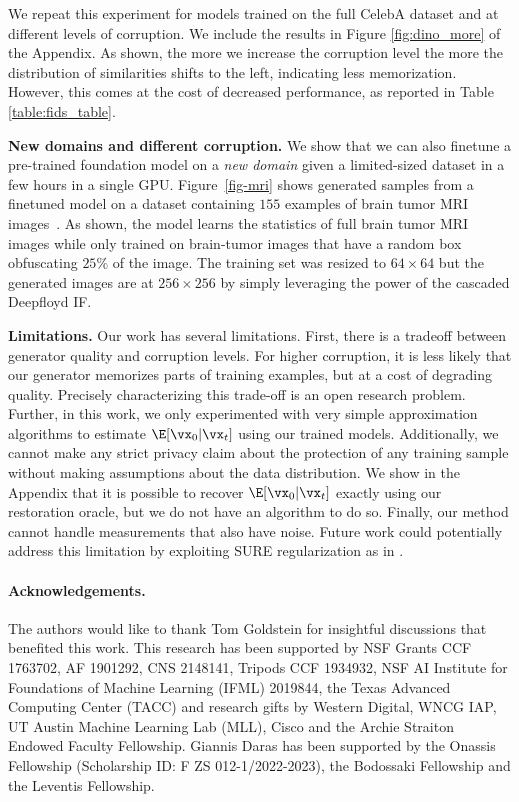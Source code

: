 \documentclass{article}
\begin{document}
We repeat this experiment for models trained on the full CelebA dataset and at different levels of corruption. We include the results in Figure \ref{fig:dino_more} of the Appendix. As shown, the more we increase the corruption level the more the distribution of similarities shifts to the left, indicating less memorization. However, this comes at the cost of decreased performance, as reported in Table \ref{table:fids_table}.


\textbf{New domains and different corruption.}
We show that we can also finetune a pre-trained foundation model on a \textit{new domain} given a limited-sized dataset in a few hours in a single GPU. Figure~\ref{fig-mri} shows generated samples from a finetuned model on a dataset containing $155$ examples of brain tumor MRI images~\citep{brain-tumor-dataset}.
As shown, the model learns the statistics of full brain tumor MRI images while only trained on brain-tumor images that have a random box obfuscating $25\%$ of the image. 
The training set was resized to $64\times 64$ but the generated images are at $256 \times 256$ by simply leveraging the power of the cascaded Deepfloyd IF.



\textbf{Limitations.}
Our work has several limitations. First, there is a tradeoff between generator quality and corruption levels. For higher corruption, it is less likely that our generator memorizes parts of training examples, but at a cost of degrading quality. Precisely characterizing this trade-off is an open research problem. Further, in this work, we only experimented with very simple approximation algorithms to estimate $\E[\vx_0|\vx_t]$ using our trained models. Additionally, we cannot make any strict privacy claim about the protection of any training sample without making assumptions about the data distribution.
We show in the Appendix that it is possible to recover $\E[\vx_0|\vx_t]$ exactly using our restoration oracle, but we do not have an algorithm to do so. Finally, our method cannot handle measurements that also have noise. Future work could potentially address this limitation by exploiting SURE regularization as in \citep{aali2023solving}.

\paragraph{Acknowledgements.}
The authors would like to thank Tom Goldstein for insightful discussions that benefited this work.
This research has been supported by NSF Grants CCF 1763702,
AF 1901292, CNS 2148141, Tripods CCF 1934932, NSF AI Institute for Foundations of Machine Learning (IFML) 2019844, the Texas Advanced Computing Center (TACC) and research gifts by Western Digital, WNCG IAP, UT Austin Machine Learning Lab (MLL), Cisco and the Archie Straiton Endowed Faculty Fellowship. Giannis Daras has been supported by the Onassis Fellowship (Scholarship ID: F ZS 012-1/2022-2023), the Bodossaki Fellowship and the Leventis Fellowship. 
\end{document}
